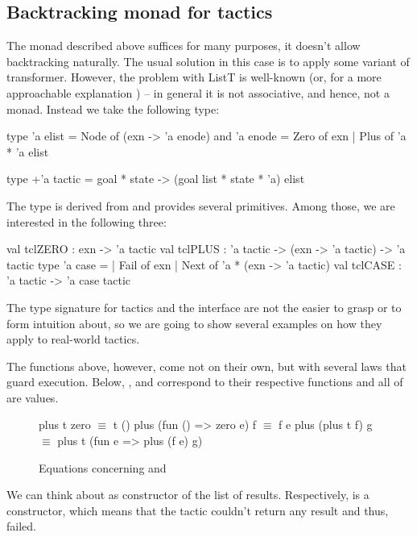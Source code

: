 \subsection{Backtracking monad for tactics}
\label{sec:backtr-monad-tact}

The monad described above suffices for many purposes, it doesn't allow backtracking naturally.
The usual solution in this case is to apply some variant of  transformer.
However, the problem with ListT is well-known \cite{jones1993composing} (or, for a more approachable explanation \cite{ListTDoneRight}) -- in general it is not associative, and hence, not a monad.
Instead we take the following type:

\begin{ocaml}
type 'a elist = Node of (exn -> 'a enode)
and 'a enode = Zero of exn | Plus of 'a * 'a elist

type +'a tactic = goal * state -> (goal list * state * 'a) elist
\end{ocaml}

The type is derived from \cite{kiselyovBacktrackingInterleavingTerminating2005} and provides several primitives.
Among those, we are interested in the following three:
\begin{ocaml}
val tclZERO : exn -> 'a tactic
val tclPLUS : 'a tactic -> (exn -> 'a tactic) -> 'a tactic
type 'a case =
  | Fail of exn
  | Next of 'a * (exn -> 'a tactic)
val tclCASE : 'a tactic -> 'a case tactic
\end{ocaml}

The type signature for tactics and the interface are not the easier to grasp or to form intuition about, so we are going to show several examples on how they apply to real-world tactics.

The functions above, however, come not on their own, but with several laws that guard execution.
Below, ,  and  correspond to their respective functions and all of  are values.
\begin{figure}[H]
\begin{coq}
plus t zero $\equiv$ t ()
plus (fun () => zero e) f $\equiv$ f e
plus (plus t f) g $\equiv$ plus t (fun e => plus (f e) g)
\end{coq}
\caption{Equations concerning  and }
\label{fig:zero_plus_eq}
\end{figure}

We can think about  as  constructor of the list of results.
Respectively,  is a  constructor, which means that the tactic couldn't return any result and thus, failed.

